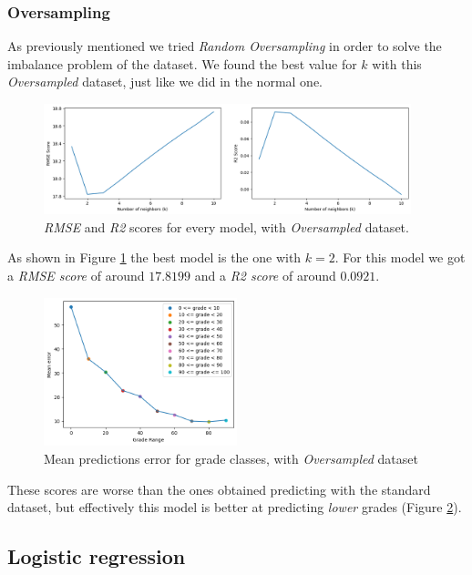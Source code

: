 \documentclass{article}
\begin{document}
\subsubsection{Oversampling}
As previously mentioned we tried \textit{Random Oversampling} in order to solve the imbalance problem of the dataset.
We found the best value for $k$ with this \textit{Oversampled} dataset, just like we did in the normal one.
\begin{figure}[ht]
\centering
\includegraphics[width=0.95\textwidth]{KNN_scores_over.png}
\caption{\textit{RMSE} and \textit{R2} scores for every model, with \textit{Oversampled} dataset.}
\label{fig:knn-scores-over}
\end{figure}
As shown in Figure \ref{fig:knn-scores-over} the best model is the one with $k = 2$.
For this model we got a \textit{RMSE score} of around $17.8199$ and a \textit{R2 score} of around $0.0921$.
\begin{figure}[ht]
\centering
\includegraphics[width=0.5\textwidth]{KNN_errs_class_over.png}
\caption{Mean predictions error for grade classes, with \textit{Oversampled} dataset}
\label{fig:knn-err-over}
\end{figure}
These scores are worse than the ones obtained predicting with the standard dataset, but effectively this model is better at predicting \textit{lower} grades (Figure \ref{fig:knn-err-over}).

\FloatBarrier
\subsection{Logistic regression}
\end{document}

